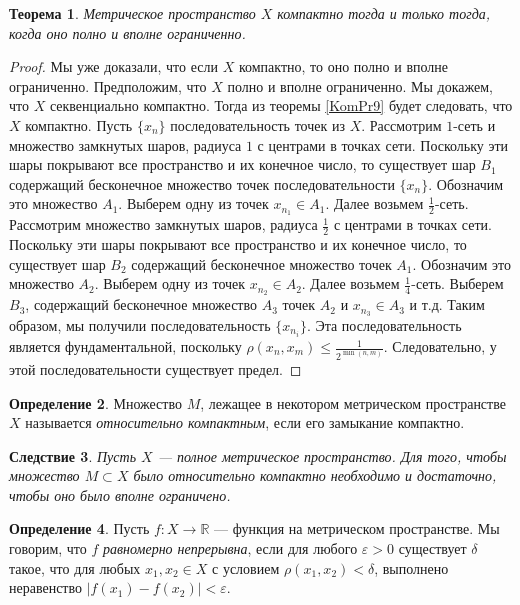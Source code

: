\documentclass[12pt, titlepage, oneside]{amsbook}
\newcommand{\RR}{\mathbb{R}}
\newtheorem{theorem}{Теорема}[chapter]
\newtheorem{corollary}[theorem]{Следствие}
\theoremstyle{definition}
\newtheorem{definition}[theorem]{Определение}
\theoremstyle{remark}
\begin{document}
\begin{theorem}
	\label{KomPr10}
	Метрическое пространство $X$ компактно тогда и только тогда, когда оно полно и вполне ограниченно.
\end{theorem}

\begin{proof}
	Мы уже доказали, что если $X$ компактно, то оно полно и вполне ограниченно. Предположим, что $X$ полно и вполне ограниченно. Мы докажем, что $X$ секвенциально компактно. Тогда из теоремы \ref{KomPr9} будет следовать, что $X$ компактно. Пусть $\{x_n\}$ последовательность точек из $X$. Рассмотрим $1$-сеть и множество замкнутых шаров, радиуса $1$ с центрами в точках сети. Поскольку эти шары покрывают все пространство и их конечное число, то существует шар $B_1$ содержащий бесконечное множество точек последовательности $\{x_n\}$. Обозначим это множество $A_1$. Выберем одну из точек $x_{n_1}\in A_1$. Далее возьмем $\frac{1}{2}$-сеть. Рассмотрим множество замкнутых шаров, радиуса $\frac{1}{2}$ с центрами в точках сети. Поскольку эти шары покрывают все пространство и их конечное число, то существует шар $B_2$ содержащий бесконечное множество точек $A_1$. Обозначим это множество $A_2$. Выберем одну из точек $x_{n_2}\in A_2$. Далее возьмем $\frac{1}{4}$-сеть. Выберем $B_3$, содержащий бесконечное множество $A_3$ точек $A_2$ и $x_{n_3}\in A_3$ и т.д. Таким образом, мы получили последовательность $\{x_{n_i}\}$. Эта последовательность является фундаментальной, поскольку $\rho(x_n,x_m)\leq\frac{1}{2^{\min(n,m)}}$. Следовательно, у этой последовательности существует предел.
\end{proof}

\begin{definition}
	Множество $M$, лежащее в некотором метрическом пространстве $X$ называется \emph{относительно компактным}, если его замыкание компактно.
\end{definition}

\begin{corollary}
	\label{KomPr10-1}
	Пусть $X$ --- полное метрическое пространство. Для того, чтобы множество $M\subset X$ было относительно компактно необходимо и достаточно, чтобы оно было вполне ограничено.
\end{corollary}


\begin{definition}
	Пусть $f\colon X\rightarrow\RR$ --- функция на метрическом пространстве. Мы говорим, что $f$ \emph{равномерно непрерывна}, если для любого $\varepsilon>0$ существует $\delta$ такое, что для любых $x_1,x_2\in X$ с условием $\rho(x_1,x_2)<\delta$, выполнено неравенство $|f(x_1)-f(x_2)|<\varepsilon$.
\end{definition}
\end{document}
